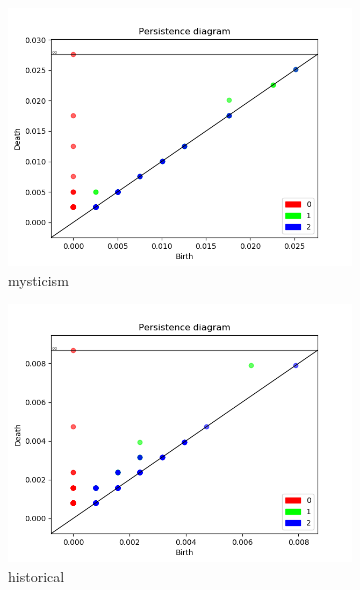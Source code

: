 \documentclass[fleqn]{article}
\begin{document}
	\begin{figure}
		\begin{subfigure}[t]{0.425\textwidth}
			\includegraphics[width=\textwidth]{figures/stopwords_excluded/mysticism.png}
			\caption{mysticism}
			\label{fig:sw:mysticism}
		\end{subfigure}\hfill
		\begin{subfigure}[t]{0.425\textwidth}
			\includegraphics[width=\textwidth]{figures/stopwords_excluded/hystorical.png}
			\caption{historical}
			\label{fig:sw:historical}
		\end{subfigure}\hfill
		\\
		\begin{subfigure}[t]{0.425\textwidth}

\end{subfigure}
\end{figure}
\end{document}
